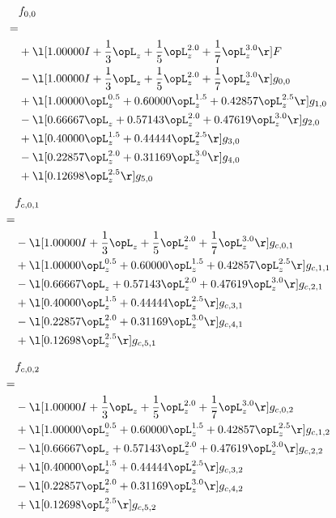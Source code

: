 \begin{alignat}{2} 
\label{eq:f_00_0} 
& f_{0,0} \nonumber \\ 
 = \\ 
& + \l[  1.00000 I + \frac{1}{3} \opL_z + \frac{1}{5} \opL_z^{2.0} + \frac{1}{7} \opL_z^{3.0}  \r] F \nonumber \\ 
& - \l[  1.00000 I + \frac{1}{3} \opL_z + \frac{1}{5} \opL_z^{2.0} + \frac{1}{7} \opL_z^{3.0}  \r] g_{0,0} \nonumber \\ 
& + \l[  1.00000 \opL_z^{0.5} +  0.60000 \opL_z^{1.5} +  0.42857 \opL_z^{2.5}  \r] g_{1,0} \nonumber \\ 
& - \l[  0.66667 \opL_z +  0.57143 \opL_z^{2.0} +  0.47619 \opL_z^{3.0}  \r] g_{2,0} \nonumber \\ 
& + \l[  0.40000 \opL_z^{1.5} +  0.44444 \opL_z^{2.5}  \r] g_{3,0} \nonumber \\ 
& - \l[  0.22857 \opL_z^{2.0} +  0.31169 \opL_z^{3.0}  \r] g_{4,0} \nonumber \\ 
& + \l[  0.12698 \opL_z^{2.5}  \r] g_{5,0} \nonumber \\ 
\end{alignat} 


\begin{alignat}{2} 
\label{eq:f_01_0} 
& f_{c,0,1} \nonumber \\ 
 = \\ 
& - \l[  1.00000 I + \frac{1}{3} \opL_z + \frac{1}{5} \opL_z^{2.0} + \frac{1}{7} \opL_z^{3.0}  \r] g_{c,0,1} \nonumber \\ 
& + \l[  1.00000 \opL_z^{0.5} +  0.60000 \opL_z^{1.5} +  0.42857 \opL_z^{2.5}  \r] g_{c,1,1} \nonumber \\ 
& - \l[  0.66667 \opL_z +  0.57143 \opL_z^{2.0} +  0.47619 \opL_z^{3.0}  \r] g_{c,2,1} \nonumber \\ 
& + \l[  0.40000 \opL_z^{1.5} +  0.44444 \opL_z^{2.5}  \r] g_{c,3,1} \nonumber \\ 
& - \l[  0.22857 \opL_z^{2.0} +  0.31169 \opL_z^{3.0}  \r] g_{c,4,1} \nonumber \\ 
& + \l[  0.12698 \opL_z^{2.5}  \r] g_{c,5,1} \nonumber \\ 
\end{alignat} 


\begin{alignat}{2} 
\label{eq:f_02_0} 
& f_{c,0,2} \nonumber \\ 
 = \\ 
& - \l[  1.00000 I + \frac{1}{3} \opL_z + \frac{1}{5} \opL_z^{2.0} + \frac{1}{7} \opL_z^{3.0}  \r] g_{c,0,2} \nonumber \\ 
& + \l[  1.00000 \opL_z^{0.5} +  0.60000 \opL_z^{1.5} +  0.42857 \opL_z^{2.5}  \r] g_{c,1,2} \nonumber \\ 
& - \l[  0.66667 \opL_z +  0.57143 \opL_z^{2.0} +  0.47619 \opL_z^{3.0}  \r] g_{c,2,2} \nonumber \\ 
& + \l[  0.40000 \opL_z^{1.5} +  0.44444 \opL_z^{2.5}  \r] g_{c,3,2} \nonumber \\ 
& - \l[  0.22857 \opL_z^{2.0} +  0.31169 \opL_z^{3.0}  \r] g_{c,4,2} \nonumber \\ 
& + \l[  0.12698 \opL_z^{2.5}  \r] g_{c,5,2} \nonumber \\ 
\end{alignat} 


